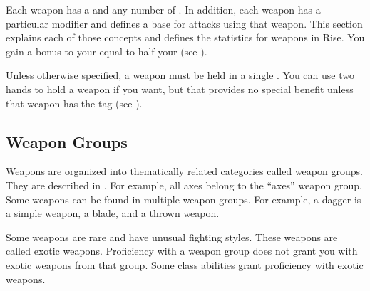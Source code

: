     Each weapon has a  and any number of .
    In addition, each weapon has a particular  modifier and defines a base  for attacks using that weapon.
    This section explains each of those concepts and defines the statistics for weapons in Rise.
    You gain a bonus to your  equal to half your  (see ).

    Unless otherwise specified, a weapon must be held in a single .
    You can use two hands to hold a weapon if you want, but that provides no special benefit unless that weapon has the  tag (see ).

    \subsection{Weapon Groups}\label{Weapon Groups}

        Weapons are organized into thematically related categories called weapon groups. They are described in . For example, all axes belong to the ``axes'' weapon group. Some weapons can be found in multiple weapon groups. For example, a dagger is a simple weapon, a blade, and a thrown weapon.

        \label{Exotic Weapons} Some weapons are rare and have unusual fighting styles.
        These weapons are called exotic weapons.
        Proficiency with a weapon group does not grant you with exotic weapons from that group.
        Some class abilities grant proficiency with exotic weapons.

